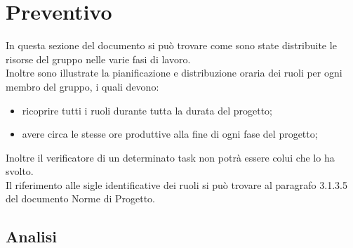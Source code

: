 \section{Preventivo}
In questa sezione del documento si può trovare come sono state distribuite le risorse del gruppo nelle varie fasi di lavoro.\\
Inoltre sono illustrate la pianificazione e distribuzione oraria dei ruoli per ogni membro del gruppo, i quali devono:
\begin{itemize}
	\item ricoprire tutti i ruoli durante tutta la durata del progetto;
	\item avere circa le stesse ore produttive alla fine di ogni fase del progetto;
\end{itemize}
Inoltre il verificatore di un determinato task non potrà essere colui che lo ha svolto.\\
Il riferimento alle sigle identificative dei ruoli si può trovare al paragrafo 3.1.3.5 del documento Norme di Progetto.

\subsection{Analisi}
%
